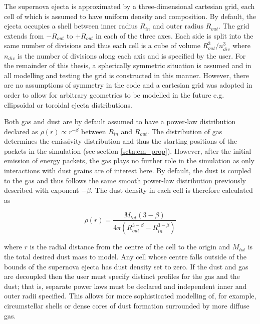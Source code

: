 	The supernova ejecta is approximated by a three-dimensional cartesian grid, each cell of which is assumed to have uniform density and composition.  By default, the ejecta occupies a shell between inner radius $R_{in}$ and outer radius $R_{out}$. The grid extends from $-R_{out}$ to $+R_{out}$ in each of the three axes.  Each side is split into the same number of divisions and thus each cell is a cube of volume $R_{out}^3/n_{div}^3$ where $n_{div}$ is the number of divisions along each axis and is specified by the user.  For the remainder of this thesis, a spherically symmetric situation is assumed and in all modelling and testing the grid is constructed in this manner.  However, there are no assumptions of symmetry in the code and a cartesian grid was adopted in order to allow for arbitrary geometries to be modelled in the future e.g. ellipsoidal or toroidal ejecta distributions.
	
	  Both gas and dust are by default assumed to have a power-law distribution declared as  $\rho(r) \propto r^{-\beta}$ between $R_{in}$ and $R_{out}$.  The distribution of gas determines the emissivity distribution and thus the starting positions of the packets in the simulation (see section \ref{sctn:em_prop}).  However, after the initial emission of energy packets, the gas plays no further role in the simulation as only interactions with dust grains are of interest here.  By default, the dust is coupled to the gas and thus follows the same smooth power-law distribution previously described with exponent $-\beta$.  The dust density in each cell is therefore calculated as
	
\begin{equation}
\rho (r)= \frac{M_{tot}(3-\beta)}{4\pi (R_{out}^{3-\beta}-R_{in}^{3-\beta})}
\end{equation}
	
	
\noindent where $r$ is the radial distance from the centre of the cell to the origin and $M_{tot}$ is the total desired dust mass to model.  Any cell whose centre falls outside of the bounds of the supernova ejecta has dust density set to zero.  If the dust and gas are decoupled then the user must specify distinct profiles for the gas and the dust; that is, separate power laws must be declared and independent inner and outer radii specified.  This allows for more sophisticated modelling of, for example, circumstellar shells or dense cores of dust formation surrounded by more diffuse gas.

